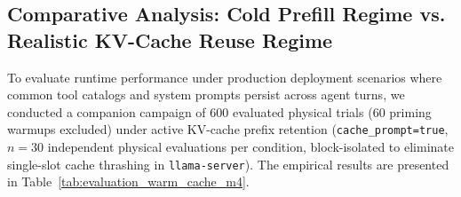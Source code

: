 \documentclass[11pt,a4paper]{article}
\begin{document}


\subsection{Comparative Analysis: Cold Prefill Regime vs. Realistic KV-Cache Reuse Regime}
To evaluate runtime performance under production deployment scenarios where common tool catalogs and system prompts persist across agent turns, we conducted a companion campaign of 600 evaluated physical trials (60 priming warmups excluded) under active KV-cache prefix retention (\texttt{cache\_prompt=true}, $n=30$ independent physical evaluations per condition, block-isolated to eliminate single-slot cache thrashing in \texttt{llama-server}). The empirical results are presented in Table~\ref{tab:evaluation_warm_cache_m4}.


\end{document}
